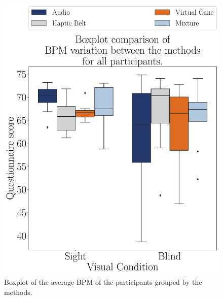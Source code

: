 \begin{figure}[!htb]
    \centering
    \begin{minipage}{0.45\textwidth}
        \centering
        \includegraphics[width = \textwidth]{Resultados/ECG/Figuras/pdf/boxplot_ecg_bpm_4_scene.pdf}
        \caption{Boxplot of the average BPM of the participants grouped by the methods.}
        \label{fig:boxplot_ecg_bpm_4_scene}
    \end{minipage}
    \begin{minipage}{0.075\textwidth}
        \hfill
    \end{minipage}
    \begin{minipage}{0.45\textwidth}
        \centering

\end{minipage}
\end{figure}
